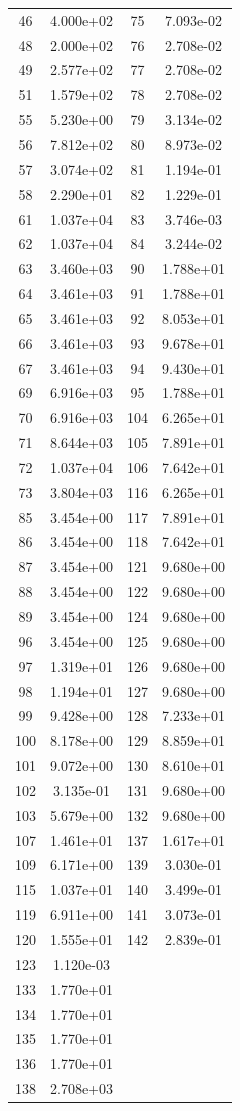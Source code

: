 \documentclass[12pt]{article}
\begin{document}
\begin{longtable}{@{}cccc@{}}
46 & 4.000e+02 & 75 & 7.093e-02 \\
48 & 2.000e+02 & 76 & 2.708e-02 \\
49 & 2.577e+02 & 77 & 2.708e-02 \\
51 & 1.579e+02 & 78 & 2.708e-02 \\
55 & 5.230e+00 & 79 & 3.134e-02 \\
56 & 7.812e+02 & 80 & 8.973e-02 \\
57 & 3.074e+02 & 81 & 1.194e-01 \\
58 & 2.290e+01 & 82 & 1.229e-01 \\
61 & 1.037e+04 & 83 & 3.746e-03 \\
62 & 1.037e+04 & 84 & 3.244e-02 \\
63 & 3.460e+03 & 90 & 1.788e+01 \\
64 & 3.461e+03 & 91 & 1.788e+01 \\
65 & 3.461e+03 & 92 & 8.053e+01 \\
66 & 3.461e+03 & 93 & 9.678e+01 \\
67 & 3.461e+03 & 94 & 9.430e+01 \\
69 & 6.916e+03 & 95 & 1.788e+01 \\
70 & 6.916e+03 & 104 & 6.265e+01 \\
71 & 8.644e+03 & 105 & 7.891e+01 \\
72 & 1.037e+04 & 106 & 7.642e+01 \\
73 & 3.804e+03 & 116 & 6.265e+01 \\
85 & 3.454e+00 & 117 & 7.891e+01 \\
86 & 3.454e+00 & 118 & 7.642e+01 \\
87 & 3.454e+00 & 121 & 9.680e+00 \\
88 & 3.454e+00 & 122 & 9.680e+00 \\
89 & 3.454e+00 & 124 & 9.680e+00 \\
96 & 3.454e+00 & 125 & 9.680e+00 \\
97 & 1.319e+01 & 126 & 9.680e+00 \\
98 & 1.194e+01 & 127 & 9.680e+00 \\
99 & 9.428e+00 & 128 & 7.233e+01 \\
100 & 8.178e+00 & 129 & 8.859e+01 \\
101 & 9.072e+00 & 130 & 8.610e+01 \\
102 & 3.135e-01 & 131 & 9.680e+00 \\
103 & 5.679e+00 & 132 & 9.680e+00 \\
107 & 1.461e+01 & 137 & 1.617e+01 \\
109 & 6.171e+00 & 139 & 3.030e-01 \\
115 & 1.037e+01 & 140 & 3.499e-01 \\
119 & 6.911e+00 & 141 & 3.073e-01 \\
120 & 1.555e+01 & 142 & 2.839e-01 \\
123 & 1.120e-03 &  &  \\
133 & 1.770e+01 &  &  \\
134 & 1.770e+01 &  &  \\
135 & 1.770e+01 &  &  \\
136 & 1.770e+01 &  &  \\
138 & 2.708e+03 &  &  \\


\end{longtable}
\end{document}
